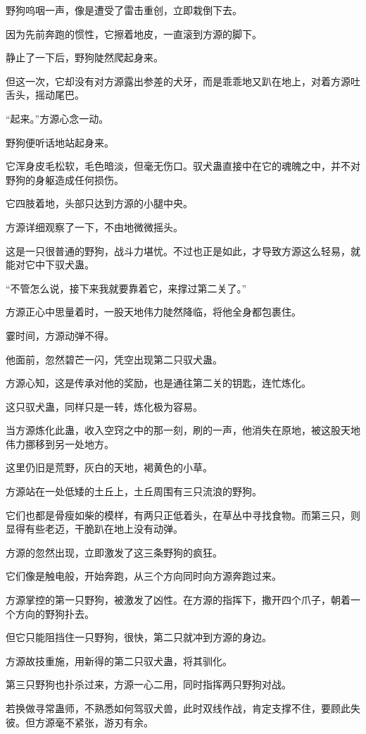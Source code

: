\begin{this_body}
野狗呜咽一声，像是遭受了雷击重创，立即栽倒下去。

因为先前奔跑的惯性，它擦着地皮，一直滚到方源的脚下。

静止了一下后，野狗陡然爬起身来。

但这一次，它却没有对方源露出参差的犬牙，而是乖乖地又趴在地上，对着方源吐舌头，摇动尾巴。

“起来。”方源心念一动。

野狗便听话地站起身来。

它浑身皮毛松软，毛色暗淡，但毫无伤口。驭犬蛊直接中在它的魂魄之中，并不对野狗的身躯造成任何损伤。

它四肢着地，头部只达到方源的小腿中央。

方源详细观察了一下，不由地微微摇头。

这是一只很普通的野狗，战斗力堪忧。不过也正是如此，才导致方源这么轻易，就能对它中下驭犬蛊。

“不管怎么说，接下来我就要靠着它，来撑过第二关了。”

方源正心中思量着时，一股天地伟力陡然降临，将他全身都包裹住。

霎时间，方源动弹不得。

他面前，忽然碧芒一闪，凭空出现第二只驭犬蛊。

方源心知，这是传承对他的奖励，也是通往第二关的钥匙，连忙炼化。

这只驭犬蛊，同样只是一转，炼化极为容易。

当方源炼化此蛊，收入空窍之中的那一刻，刷的一声，他消失在原地，被这股天地伟力挪移到另一处地方。

这里仍旧是荒野，灰白的天地，褐黄色的小草。

方源站在一处低矮的土丘上，土丘周围有三只流浪的野狗。

它们也都是骨瘦如柴的模样，有两只正低着头，在草丛中寻找食物。而第三只，则显得有些老迈，干脆趴在地上没有动弹。

方源的忽然出现，立即激发了这三条野狗的疯狂。

它们像是触电般，开始奔跑，从三个方向同时向方源奔跑过来。

方源掌控的第一只野狗，被激发了凶性。在方源的指挥下，撒开四个爪子，朝着一个方向的野狗扑去。

但它只能阻挡住一只野狗，很快，第二只就冲到方源的身边。

方源故技重施，用新得的第二只驭犬蛊，将其驯化。

第三只野狗也扑杀过来，方源一心二用，同时指挥两只野狗对战。

若换做寻常蛊师，不熟悉如何驾驭犬兽，此时双线作战，肯定支撑不住，要顾此失彼。但方源毫不紧张，游刃有余。


\end{this_body}

